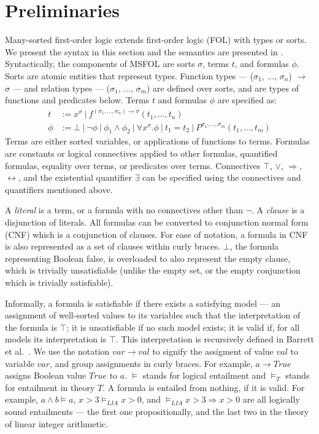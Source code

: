 \documentclass{article}
\begin{document}
\section{Preliminaries}
\label{sec:prelims}
	Many-sorted first-order logic extends
	first-order logic (FOL) with 
	types or sorts. We present the 
	syntax in this section and the 
	semantics are presented in
	\cite{Barrett2018}. Syntactically, 
	the components of MSFOL are sorts 
	$\sigma$, terms $t$, and 
	formulas $\phi$. Sorts are 
	atomic entities that 
	represent types. Function types 
	--- ($\sigma_1$, ..., $\sigma_n$) 
	$\to$ $\sigma$ ---
	and relation types 
	--- ($\sigma_1$, ..., $\sigma_m$)
	are defined over sorts, and 
	are types of functions and 
	predicates below. Terms $t$ and 
	formulas $\phi$ are specified as:
	\begin{align*}
		t &:= x^{\sigma}\ |\ 
		f^{(\sigma_1, ..., \sigma_n) \to 
			\sigma}	(t_1, ..., t_n)\\
		\phi &:= \bot\ |\ \neg \phi\ |\ 
		\phi_1 \land \phi_2\ |\ \forall 
		x^{\sigma} . \phi\ |\ t_1 = t_2
		\ |\ P^{\sigma_1,...,\sigma_m}
		(t_1, ..., t_m)
	\end{align*}
	Terms are either sorted variables, 
	or applications of functions to terms.
	Formulas are constants or logical 
	connectives applied to other 
	formulas, quantified formulas, 
	equality over terms, or predicates 
	over terms. Connectives $\top$, $\lor$, 
	$\Rightarrow$, $\leftrightarrow$, and the 
	existential	quantifier $\exists$ 
	can be specified using the connectives 
	and quantifiers mentioned above.
	
	A \textit{literal} is a term, or a 
	formula with no connectives other than 
	$\neg$. A \textit{clause} is a 
	disjunction of literals. All formulas 
	can be converted to conjunction normal 
	form (CNF) which is a conjunction of 
	clauses. For ease of notation, 
	a formula in CNF is also represented
	as a set of clauses within curly 
	braces. $\bot$, the formula 
	representing Boolean false, 
	is overloaded to also represent
	the empty clause, which is trivially
	unsatisfiable (unlike the empty set,
	or the empty conjunction which is 
	trivially satisfiable).
	
	Informally, a formula is satisfiable
	if there exists a satisfying model 
	--- an assignment of well-sorted 
	values to its variables such that 
	the interpretation of the formula 
	is $\top$; it is unsatisfiable if 
	no such model exists; it is valid
	if, for all models its interpretation
	is $\top$. This interpretation 
	is recursively defined in 
	Barrett et al.~\cite{Barrett2018}.
	We use the notation 
	$var \to val$ to signify the 
	assigment of value $val$ to 
	variable $var$, and group 
	assignments in curly braces. 
	For example, 
	$a \to True$ assigns Boolean value 
	$True$ to $a$. $\models$ stands for 
	logical entailment and $\models_T$ 
	stands for entailment in theory $T$. 
	A formula is entailed from nothing, 
	if it is valid. For example, 
	$a \land b \models a$,
	$x > 3 \models_{LIA} x > 0$, and 
	$\models_{LIA} x > 3 \Rightarrow 
	x > 0$ are all logically sound 
	entailments --- the first one 
	propositionally, and the
	last two in the theory of linear 
	integer arithmetic.
	
\end{document}
